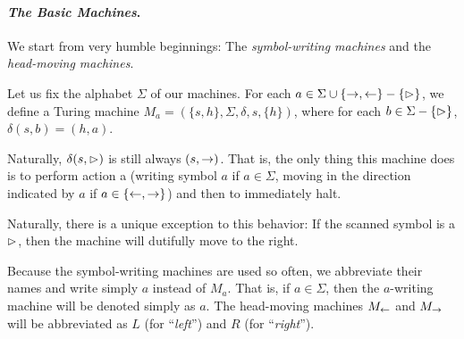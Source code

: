 \paragraph{\textit{The Basic Machines}.} We start from very humble beginnings: The \textit{symbol-writing machines} and the \textit{head-moving machines}. 

Let us fix the alphabet $\Sigma$ of our machines. For each $a \in \Sigma \cup \{ \rightarrow, \leftarrow \} - \{ \vartriangleright \}$, we define a Turing machine $M_a = (\{s, h\}, \Sigma, \delta, s, \{h\})$, where for each $b \in \Sigma - \{ \vartriangleright \}$, $\delta(s, b) = (h, a)$.

Naturally, $\delta(s, \vartriangleright)$ is still always $(s, \rightarrow)$. That is, the only thing this machine does is to perform action a (writing symbol $a$ if $a \in \Sigma$, moving in the direction indicated by $a$ if $a \in \{ \leftarrow, \rightarrow \}$) and then to immediately halt.

Naturally, there is a unique exception to this behavior: If the scanned symbol is a $\vartriangleright$, then the machine will dutifully move to the right.

Because the symbol-writing machines are used so often, we abbreviate their 
names and write simply $a$ instead of $M_a$. That is, if $a \in \Sigma$, then the $a$-writing machine will be denoted simply as $a$. The head-moving machines $M_{\leftarrow}$ and $M_{\rightarrow}$ will be abbreviated as $L$ (for ``\textit{left}'') and $R$ (for ``\textit{right}''). 

